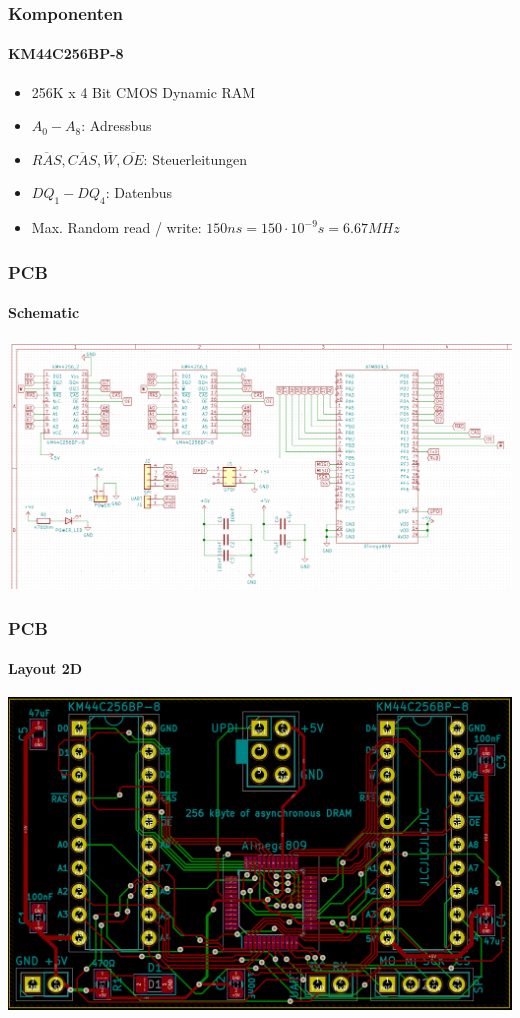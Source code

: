 \documentclass{beamer}
\begin{document}
\begin{frame}

	\frametitle{Komponenten}
	\framesubtitle{KM44C256BP-8}
	\begin{itemize}
		\item 256K x 4 Bit CMOS Dynamic RAM
		\item $A_0 - A_8$: Adressbus
		\item $\overline{RAS}, \overline{CAS}, \overline{W}, \overline{OE}$: Steuerleitungen
		\item $DQ_1 - DQ_4$: Datenbus
		\item Max. Random read / write: $150ns = 150\cdot 10^{-9}s = 6.67MHz$
	\end{itemize}
	
\end{frame}

\begin{frame}

	\frametitle{PCB}
	\framesubtitle{Schematic}
	\begin{center}
		\includegraphics[scale=0.243]{images/KiCAD_Schematic_View.png}
	\end{center}

\end{frame}

\begin{frame}

	\frametitle{PCB}
	\framesubtitle{Layout 2D}
	\begin{center}
		\includegraphics[scale=0.15]{images/KiCAD_2D_PCB_View.png}
	\end{center}
	
\end{frame}
\end{document}
